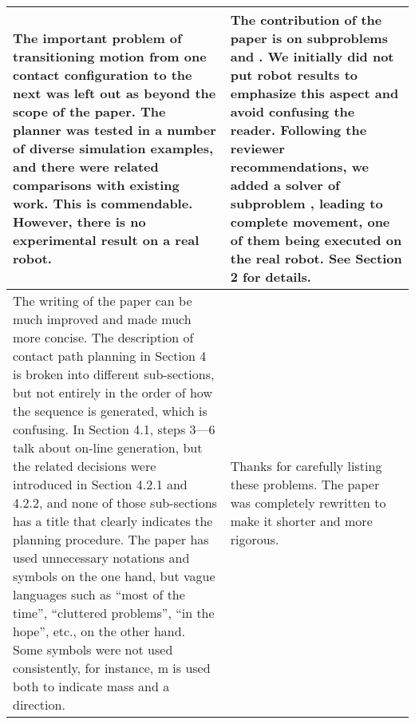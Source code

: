 \documentclass[a4paper]{article}
\begin{document}
\begin{longtable}{|p{21em}|p{21em}|}
\\ \hline %
The important problem of transitioning motion from one contact configuration to the next was left out as beyond the scope of the paper. 
The planner was tested in a number of diverse simulation examples, and there were related comparisons with existing work. This is commendable. However, there is no experimental result on a real robot. 
&
The contribution of the paper is on subproblems \mP1 and \mP2. 
We initially did not put robot results to emphasize this aspect and avoid confusing the reader.
Following the reviewer recommendations, we added a solver of subproblem \mP3, leading to complete movement, one of them being executed on the real robot. 
\newline See Section 2 for details.
\\ \hline %
The writing of the paper can be much improved and made much more concise. The description of contact path planning in Section 4 is broken into different sub-sections, but not entirely in the order of how the sequence is generated, which is confusing. In Section 4.1, steps 3—6 talk about on-line generation, but the related decisions were introduced in Section 4.2.1 and 4.2.2, and none of those sub-sections has a title that clearly indicates the planning procedure. The paper has used unnecessary notations and symbols on the one hand, but vague languages such as “most of the time”, “cluttered problems”, “in the hope”, etc., on the other hand. Some symbols were not used consistently, for instance, m is used both to indicate mass and a direction. 
&
Thanks for carefully listing these problems. 
The paper was completely rewritten to make it shorter and more rigorous.
\\ \hline %
\end{longtable}

\newpage
\end{document}
